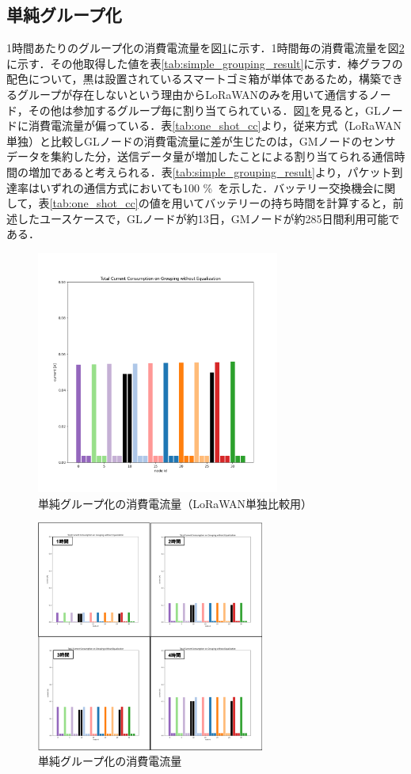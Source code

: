 \documentclass[Japanese]{dicomopapers}
\begin{document}
\subsection{単純グループ化}
1時間あたりのグループ化の消費電流量を図\ref{energy_consumption_grouping_without_eq}に示す．1時間毎の消費電流量を図\ref{gec_all}に示す．その他取得した値を表\ref{tab:simple_grouping_result}に示す．棒グラフの配色について，黒は設置されているスマートゴミ箱が単体であるため，構築できるグループが存在しないという理由からLoRaWANのみを用いて通信するノード，その他は参加するグループ毎に割り当てられている．図\ref{energy_consumption_grouping_without_eq}を見ると，GLノードに消費電流量が偏っている．表\ref{tab:one_shot_cc}より，従来方式（LoRaWAN単独）と比較しGLノードの消費電流量に差が生じたのは，GMノードのセンサデータを集約した分，送信データ量が増加したことによる割り当てられる通信時間の増加であると考えられる．表\ref{tab:simple_grouping_result}より，パケット到達率はいずれの通信方式においても100 \%\ を示した．バッテリー交換機会に関して，表\ref{tab:one_shot_cc}の値を用いてバッテリーの持ち時間を計算すると，前述したユースケースで，GLノードが約13日，GMノードが約285日間利用可能である．

\begin{figure}[h]
    \centering
    \includegraphics[width=8cm]{img/group_without_eq/group_consumption_without_eq_1_hour.png}
    \caption{単純グループ化の消費電流量（LoRaWAN単独比較用）}
    \label{energy_consumption_grouping_without_eq}
\end{figure}

\begin{figure}[h]
    \centering
    \includegraphics[width=7.5cm]{img/group_without_eq/all.png}
    \caption{単純グループ化の消費電流量}
    \label{gec_all}
\end{figure}
\end{document}
